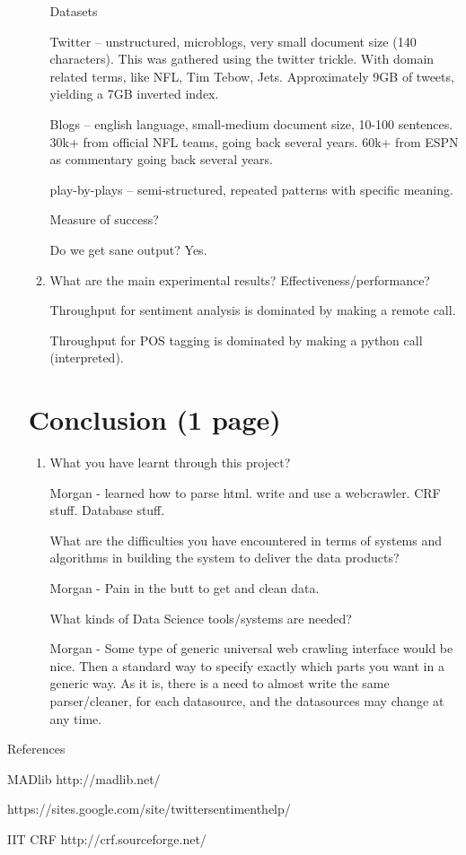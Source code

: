 \documentclass{article}
\begin{document}
\begin{enumerate}
\begin{enumerate}
    Datasets

    Twitter -- unstructured, microblogs, very small document size (140 characters). This was gathered using the twitter trickle. With domain related terms, like NFL, Tim Tebow, Jets.
    Approximately 9GB of tweets, yielding a 7GB inverted index.

    Blogs -- english language, small-medium document size, 10-100 sentences.
    30k+ from official NFL teams, going back several years.
    60k+ from ESPN as commentary going back several years.

    play-by-plays -- semi-structured, repeated patterns with specific meaning.
    

    Measure of success?

    Do we get sane output? Yes.

  \item What are the main experimental results? Effectiveness/performance?

    Throughput for sentiment analysis is dominated by making a remote call.

    Throughput for POS tagging is dominated by making a python call (interpreted).

  \end{enumerate}

  \section{Conclusion (1 page)}
  \begin{enumerate}\item What you have learnt through this project?

    Morgan - learned how to parse html. write and use a webcrawler. CRF stuff. Database stuff.

    What are the difficulties you have encountered in terms of systems and algorithms in building the system to deliver the data products?

    Morgan - Pain in the butt to get and clean data.

    What kinds of Data Science tools/systems are needed?

    Morgan - 
    Some type of generic universal web crawling interface would be nice.
    Then a standard way to specify exactly which parts you want in a generic way.
    As it is, there is a need to almost write the same parser/cleaner, for each datasource, and the datasources may change at any time.

   
  \end{enumerate}
\end{enumerate}

References

MADlib http://madlib.net/

https://sites.google.com/site/twittersentimenthelp/

IIT CRF http://crf.sourceforge.net/
\end{document}
